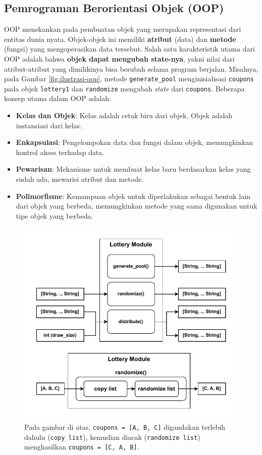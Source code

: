 \subsection{Pemrograman Berorientasi Objek (OOP)}
OOP menekankan pada pembuatan objek yang merupakan representasi dari entitas dunia nyata. Objek-objek ini memiliki \textbf{atribut} (data) dan \textbf{metode} (fungsi) yang mengoperasikan data tersebut. Salah satu karakteristik utama dari OOP adalah bahwa \textbf{objek dapat mengubah state-nya}, yakni nilai dari atribut-atribut yang dimilikinya bisa berubah selama program berjalan. Misalnya, pada Gambar \ref{fig:ilustrasi-oop}, metode \texttt{generate\_pool} menginisialisasi \texttt{coupons} pada objek \texttt{lottery1} dan \texttt{randomize} mengubah \textit{state} dari \texttt{coupons}. Beberapa konsep utama dalam OOP adalah:
\begin{itemize}
	\item \textbf{Kelas dan Objek}: Kelas adalah cetak biru dari objek. Objek adalah instansiasi dari kelas.
	\item \textbf{Enkapsulasi}: Pengelompokan data dan fungsi dalam objek, memungkinkan kontrol akses terhadap data.
	\item \textbf{Pewarisan}: Mekanisme untuk membuat kelas baru berdasarkan kelas yang sudah ada, mewarisi atribut dan metode.
	\item \textbf{Polimorfisme}: Kemampuan objek untuk diperlakukan sebagai bentuk lain dari objek yang berbeda, memungkinkan metode yang sama digunakan untuk tipe objek yang berbeda.
\end{itemize}


\begin{figure}[h]
	\centering
	\includegraphics[width=\textwidth]{../assets/functional.pdf}
	\caption{Pada gambar di atas, \texttt{coupons = [A, B, C]} digandakan terlebih dahulu (\texttt{copy list}), kemudian diacak (\texttt{randomize list}) menghasilkan \texttt{coupons = [C, A, B]}. }
	\label{fig:contoh-fp}
\end{figure}


